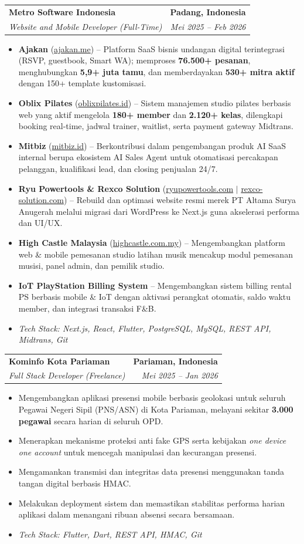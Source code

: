 \documentclass[letterpaper,10pt]{article}
\makeatletter
\newcommand{\resumeItem}[1]{
  \item\small{
    {#1 \vspace{-1.5pt}}
  }
}
\newcommand{\resumeSubheading}[4]{
  \vspace{1pt}\item
    \begin{tabular*}{1.0\textwidth}[t]{l@{\extracolsep{\fill}}r}
      \textbf{#1} & \textbf{\small #2} \\
      \textit{\small#3} & \textit{\small #4} \\
    \end{tabular*}\vspace{-4pt}
}
\newcommand{\resumeItemListStart}{\begin{itemize}[leftmargin=0.15in, label={--}, itemsep=1.5pt, parsep=0pt]}
\newcommand{\resumeItemListEnd}{\end{itemize}\vspace{-2pt}}
\makeatother
\begin{document}
    \resumeSubheading
      {Metro Software Indonesia}{Padang, Indonesia}
      {Website and Mobile Developer \textnormal{(Full-Time)}}{Mei 2025 -- Feb 2026}
      \resumeItemListStart
        \resumeItem{\textbf{Ajakan} (\href{http://ajakan.me}{ajakan.me}) -- Platform SaaS bisnis undangan digital terintegrasi (RSVP, guestbook, Smart WA); memproses \textbf{76.500+ pesanan}, menghubungkan \textbf{5,9+ juta tamu}, dan memberdayakan \textbf{530+ mitra aktif} dengan 150+ template kustomisasi.}
        \resumeItem{\textbf{Oblix Pilates} (\href{https://oblixpilates.id}{oblixpilates.id}) -- Sistem manajemen studio pilates berbasis web yang aktif mengelola \textbf{180+ member} dan \textbf{2.120+ kelas}, dilengkapi booking real-time, jadwal trainer, waitlist, serta payment gateway Midtrans.}
        \resumeItem{\textbf{Mitbiz} (\href{https://www.mitbiz.id}{mitbiz.id}) -- Berkontribusi dalam pengembangan produk AI SaaS internal berupa ekosistem AI Sales Agent untuk otomatisasi percakapan pelanggan, kualifikasi lead, dan closing penjualan 24/7.}
        \resumeItem{\textbf{Ryu Powertools \& Rexco Solution} (\href{https://ryupowertools.com}{ryupowertools.com} $|$ \href{https://rexco-solution.com}{rexco-solution.com}) -- Rebuild dan optimasi website resmi merek PT Altama Surya Anugerah melalui migrasi dari WordPress ke Next.js guna akselerasi performa dan UI/UX.}
        \resumeItem{\textbf{High Castle Malaysia} (\href{https://highcastle.com.my}{highcastle.com.my}) -- Mengembangkan platform web \& mobile pemesanan studio latihan musik mencakup modul pemesanan musisi, panel admin, dan pemilik studio.}
        \resumeItem{\textbf{IoT PlayStation Billing System} -- Mengembangkan sistem billing rental PS berbasis mobile \& IoT dengan aktivasi perangkat otomatis, saldo waktu member, dan integrasi transaksi F\&B.}
        \resumeItem{\textit{Tech Stack: Next.js, React, Flutter, PostgreSQL, MySQL, REST API, Midtrans, Git}}
      \resumeItemListEnd

    \resumeSubheading
      {Kominfo Kota Pariaman}{Pariaman, Indonesia}
      {Full Stack Developer \textnormal{(Freelance)}}{Mei 2025 -- Jan 2026}
      \resumeItemListStart
        \resumeItem{Mengembangkan aplikasi presensi mobile berbasis geolokasi untuk seluruh Pegawai Negeri Sipil (PNS/ASN) di Kota Pariaman, melayani sekitar \textbf{3.000 pegawai} secara harian di seluruh OPD.}
        \resumeItem{Menerapkan mekanisme proteksi anti fake GPS serta kebijakan \textit{one device one account} untuk mencegah manipulasi dan kecurangan presensi.}
        \resumeItem{Mengamankan transmisi dan integritas data presensi menggunakan tanda tangan digital berbasis HMAC.}
        \resumeItem{Melakukan deployment sistem dan memastikan stabilitas performa harian aplikasi dalam menangani ribuan absensi secara bersamaan.}
        \resumeItem{\textit{Tech Stack: Flutter, Dart, REST API, HMAC, Git}}
      \resumeItemListEnd
\end{document}
